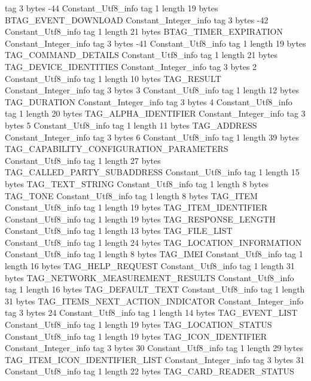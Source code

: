 {{{			tag	3
			bytes	-44
		}
		Constant_Utf8_info {
			tag	1
			length	19
			bytes	BTAG_EVENT_DOWNLOAD
		}
		Constant_Integer_info {
			tag	3
			bytes	-42
		}
		Constant_Utf8_info {
			tag	1
			length	21
			bytes	BTAG_TIMER_EXPIRATION
		}
		Constant_Integer_info {
			tag	3
			bytes	-41
		}
		Constant_Utf8_info {
			tag	1
			length	19
			bytes	TAG_COMMAND_DETAILS
		}
		Constant_Utf8_info {
			tag	1
			length	21
			bytes	TAG_DEVICE_IDENTITIES
		}
		Constant_Integer_info {
			tag	3
			bytes	2
		}
		Constant_Utf8_info {
			tag	1
			length	10
			bytes	TAG_RESULT
		}
		Constant_Integer_info {
			tag	3
			bytes	3
		}
		Constant_Utf8_info {
			tag	1
			length	12
			bytes	TAG_DURATION
		}
		Constant_Integer_info {
			tag	3
			bytes	4
		}
		Constant_Utf8_info {
			tag	1
			length	20
			bytes	TAG_ALPHA_IDENTIFIER
		}
		Constant_Integer_info {
			tag	3
			bytes	5
		}
		Constant_Utf8_info {
			tag	1
			length	11
			bytes	TAG_ADDRESS
		}
		Constant_Integer_info {
			tag	3
			bytes	6
		}
		Constant_Utf8_info {
			tag	1
			length	39
			bytes	TAG_CAPABILITY_CONFIGURATION_PARAMETERS
		}
		Constant_Utf8_info {
			tag	1
			length	27
			bytes	TAG_CALLED_PARTY_SUBADDRESS
		}
		Constant_Utf8_info {
			tag	1
			length	15
			bytes	TAG_TEXT_STRING
		}
		Constant_Utf8_info {
			tag	1
			length	8
			bytes	TAG_TONE
		}
		Constant_Utf8_info {
			tag	1
			length	8
			bytes	TAG_ITEM
		}
		Constant_Utf8_info {
			tag	1
			length	19
			bytes	TAG_ITEM_IDENTIFIER
		}
		Constant_Utf8_info {
			tag	1
			length	19
			bytes	TAG_RESPONSE_LENGTH
		}
		Constant_Utf8_info {
			tag	1
			length	13
			bytes	TAG_FILE_LIST
		}
		Constant_Utf8_info {
			tag	1
			length	24
			bytes	TAG_LOCATION_INFORMATION
		}
		Constant_Utf8_info {
			tag	1
			length	8
			bytes	TAG_IMEI
		}
		Constant_Utf8_info {
			tag	1
			length	16
			bytes	TAG_HELP_REQUEST
		}
		Constant_Utf8_info {
			tag	1
			length	31
			bytes	TAG_NETWORK_MEASUREMENT_RESULTS
		}
		Constant_Utf8_info {
			tag	1
			length	16
			bytes	TAG_DEFAULT_TEXT
		}
		Constant_Utf8_info {
			tag	1
			length	31
			bytes	TAG_ITEMS_NEXT_ACTION_INDICATOR
		}
		Constant_Integer_info {
			tag	3
			bytes	24
		}
		Constant_Utf8_info {
			tag	1
			length	14
			bytes	TAG_EVENT_LIST
		}
		Constant_Utf8_info {
			tag	1
			length	19
			bytes	TAG_LOCATION_STATUS
		}
		Constant_Utf8_info {
			tag	1
			length	19
			bytes	TAG_ICON_IDENTIFIER
		}
		Constant_Integer_info {
			tag	3
			bytes	30
		}
		Constant_Utf8_info {
			tag	1
			length	29
			bytes	TAG_ITEM_ICON_IDENTIFIER_LIST
		}
		Constant_Integer_info {
			tag	3
			bytes	31
		}
		Constant_Utf8_info {
			tag	1
			length	22
			bytes	TAG_CARD_READER_STATUS
}}}
